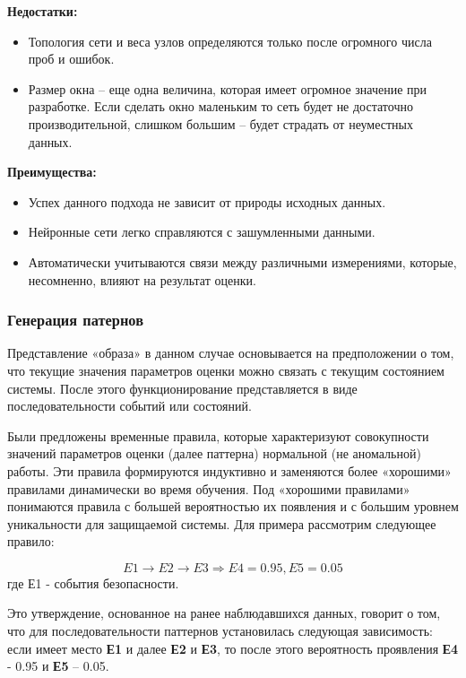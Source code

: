 \textbf{Недостатки:}
\begin{itemize}
    \item Топология сети и веса узлов определяются только после огромного числа проб и ошибок.
    \item Размер окна – еще одна величина, которая имеет огромное значение при разработке. 
    Если сделать окно маленьким то сеть будет не достаточно производительной, слишком большим 
    – будет страдать от неуместных данных.
\end{itemize}

\textbf{Преимущества:}
\begin{itemize}
    \item Успех данного подхода не зависит от природы исходных данных.
    \item Нейронные сети легко справляются с зашумленными данными.
    \item Автоматически учитываются связи между различными измерениями, которые, 
    несомненно, влияют на результат оценки.
\end{itemize}
\autocite{BeynonDavies}


\subsubsection{Генерация патернов}
Представление «образа» в данном случае основывается на предположении о том, что текущие значения 
параметров оценки можно связать с текущим состоянием системы. После этого функционирование 
представляется в виде последовательности событий или состояний.

Были предложены временные правила, которые характеризуют совокупности значений параметров оценки 
(далее паттерна) нормальной (не аномальной) работы. Эти правила формируются индуктивно и заменяются 
более «хорошими» правилами динамически во время обучения. Под «хорошими правилами» понимаются правила 
с большей вероятностью их появления и с большим уровнем уникальности для защищаемой системы. 
Для примера рассмотрим следующее правило:

\begin{equation}
	E1 \rightarrow E2\rightarrow E3 \Rightarrow E4 = 0.95, E5 = 0.05
\end{equation}
где Е1 - события безопасности.

Это утверждение, основанное на ранее наблюдавшихся данных, говорит о том, что для последовательности 
паттернов установилась следующая зависимость: если имеет место \textbf{Е1} и далее \textbf{Е2} и \textbf{Е3},
то после этого вероятность проявления \textbf{Е4} - 0.95 и \textbf{Е5} – 0.05.


